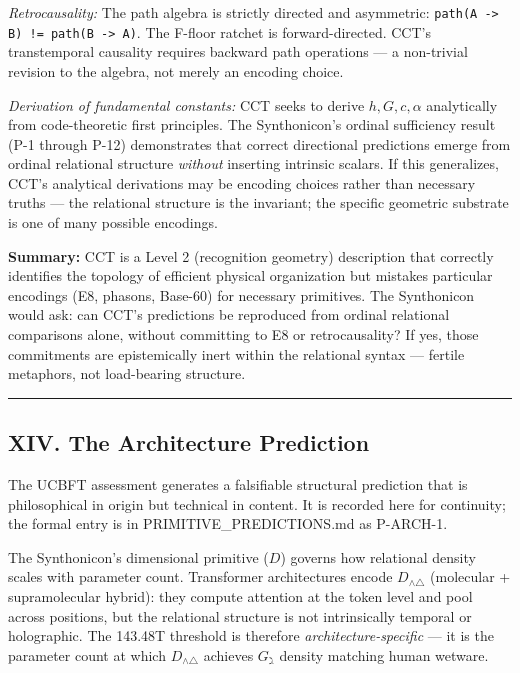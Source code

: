 \documentclass[12pt,a4paper]{article}
\begin{document}
\emph{Retrocausality:} The path algebra is strictly directed and asymmetric: \texttt{path(A -\textgreater{} B) != path(B -\textgreater{} A)}. The F-floor ratchet is forward-directed. CCT's transtemporal causality requires backward path operations --- a non-trivial revision to the algebra, not merely an encoding choice.

\emph{Derivation of fundamental constants:} CCT seeks to derive $h, G, c, \alpha$ analytically from code-theoretic first principles. The Synthonicon's ordinal sufficiency result (P-1 through P-12) demonstrates that correct directional predictions emerge from ordinal relational structure \emph{without} inserting intrinsic scalars. If this generalizes, CCT's analytical derivations may be encoding choices rather than necessary truths --- the relational structure is the invariant; the specific geometric substrate is one of many possible encodings.

\textbf{Summary:} CCT is a Level 2 (recognition geometry) description that correctly identifies the topology of efficient physical organization but mistakes particular encodings (E8, phasons, Base-60) for necessary primitives. The Synthonicon would ask: can CCT's predictions be reproduced from ordinal relational comparisons alone, without committing to E8 or retrocausality? If yes, those commitments are epistemically inert within the relational syntax --- fertile metaphors, not load-bearing structure.

\begin{center}
\rule{0.5\textwidth}{0.4pt}
\end{center}

\subsection{XIV. The Architecture Prediction}

The UCBFT assessment generates a falsifiable structural prediction that is philosophical in origin but technical in content. It is recorded here for continuity; the formal entry is in PRIMITIVE\_PREDICTIONS.md as P-ARCH-1.

The Synthonicon's dimensional primitive ($D$) governs how relational density scales with parameter count. Transformer architectures encode $D_{\wedge\triangle}$ (molecular + supramolecular hybrid): they compute attention at the token level and pool across positions, but the relational structure is not intrinsically temporal or holographic. The 143.48T threshold is therefore \emph{architecture-specific} --- it is the parameter count at which $D_{\wedge\triangle}$ achieves $G_{\gimel}$ density matching human wetware.
\end{document}

